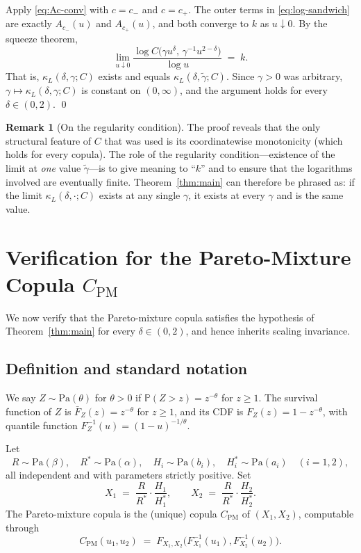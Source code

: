 \documentclass[11pt]{article}
\theoremstyle{definition}
\newtheorem{remark}[theorem]{Remark}
\newcommand{\PM}{\mathrm{PM}}
\newcommand{\Pa}{\mathrm{Pa}}
\newcommand{\Prob}{\mathbb{P}}
\begin{document}
Apply \eqref{eq:Ac-conv} with $c=c_-$ and $c=c_+$. The outer terms in
\eqref{eq:log-sandwich} are exactly $A_{c_-}(u)$ and $A_{c_+}(u)$, and
both converge to $k$ as $u\downarrow 0$. By the squeeze theorem,
\[
\lim_{u\downarrow 0}
\frac{\log C\!\bigl(\gamma u^{\delta},\,\gamma^{-1}u^{2-\delta}\bigr)}{\log u}
\;=\; k.
\]
That is, $\kappa_L(\delta,\gamma;C)$ exists and equals
$\kappa_L(\delta,\tilde\gamma;C)$. Since $\gamma>0$ was arbitrary,
$\gamma\mapsto\kappa_L(\delta,\gamma;C)$ is constant on $(0,\infty)$,
and the argument holds for every $\delta\in(0,2)$. \qed

\begin{remark}[On the regularity condition]
The proof reveals that the only structural feature of $C$ that was
used is its coordinatewise monotonicity (which holds for every
copula). The role of the regularity condition---existence of the
limit at \emph{one} value $\tilde\gamma$---is to give meaning to
``$k$'' and to ensure that the logarithms involved are eventually
finite. Theorem~\ref{thm:main} can therefore be phrased as: if the
limit $\kappa_L(\delta,\cdot;C)$ exists at any single $\gamma$, it
exists at every $\gamma$ and is the same value.
\end{remark}

\section{Verification for the Pareto-Mixture Copula $C_{\PM}$}

We now verify that the Pareto-mixture copula satisfies the hypothesis
of Theorem~\ref{thm:main} for every $\delta\in(0,2)$, and hence
inherits scaling invariance.

\subsection{Definition and standard notation}

We say $Z\sim\Pa(\theta)$ for $\theta>0$ if $\Prob(Z>z)=z^{-\theta}$
for $z\ge 1$. The survival function of $Z$ is $\bar F_Z(z)=z^{-\theta}$
for $z\ge 1$, and its CDF is $F_Z(z)=1-z^{-\theta}$, with
quantile function $F_Z^{-1}(u)=(1-u)^{-1/\theta}$.

Let
\[
R\sim\Pa(\beta),\quad R^*\sim\Pa(\alpha),\quad
H_i\sim\Pa(b_i),\quad H_i^*\sim\Pa(a_i)\quad (i=1,2),
\]
all independent and with parameters strictly positive. Set
\[
X_1 \;=\; \frac{R}{R^*}\cdot\frac{H_1}{H_1^*},
\qquad
X_2 \;=\; \frac{R}{R^*}\cdot\frac{H_2}{H_2^*}.
\]
The Pareto-mixture copula is the (unique) copula $C_{\PM}$ of
$(X_1,X_2)$, computable through
\[
C_{\PM}(u_1,u_2) \;=\; F_{X_1,X_2}\!\bigl(F_{X_1}^{-1}(u_1),F_{X_2}^{-1}(u_2)\bigr).
\]
\end{document}
